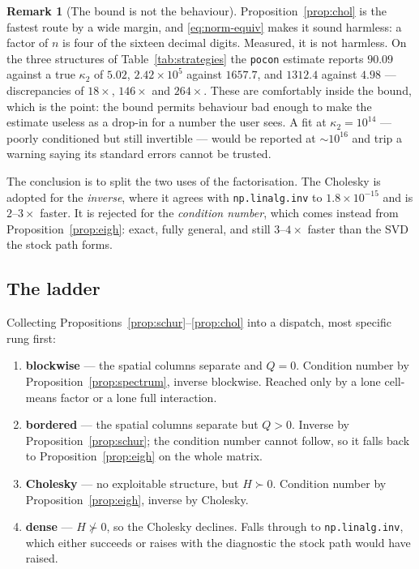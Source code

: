 \documentclass[11pt,a4paper]{article}
\theoremstyle{plain}
\theoremstyle{definition}
\newtheorem{remark}[proposition]{Remark}
\newcommand{\cond}{\kappa}
\begin{document}
\begin{remark}[The bound is not the behaviour]\label{rem:pocon}
Proposition~\ref{prop:chol} is the fastest route by a wide margin, and \eqref{eq:norm-equiv}
makes it sound harmless: a factor of $n$ is four of the sixteen decimal digits. Measured, it is
not harmless. On the three structures of Table~\ref{tab:strategies} the \texttt{pocon} estimate
reports $90.09$ against a true $\cond_2$ of $5.02$, $2.42\times10^{5}$ against $1657.7$, and
$1312.4$ against $4.98$ --- discrepancies of $18\times$, $146\times$ and $264\times$. These are
comfortably inside the bound, which is the point: the bound permits behaviour bad enough to
make the estimate useless as a drop-in for a number the user sees. A fit at
$\cond_2 = 10^{14}$ --- poorly conditioned but still invertible --- would be reported at
$\sim\!10^{16}$ and trip a warning saying its standard errors cannot be trusted.

The conclusion is to split the two uses of the factorisation. The Cholesky is adopted for the
\emph{inverse}, where it agrees with \texttt{np.linalg.inv} to $1.8\times10^{-15}$ and is
$2$--$3\times$ faster. It is rejected for the \emph{condition number}, which comes instead from
Proposition~\ref{prop:eigh}: exact, fully general, and still $3$--$4\times$ faster than the SVD
the stock path forms.
\end{remark}

\subsection{The ladder}\label{sec:ladder}

Collecting Propositions~\ref{prop:schur}--\ref{prop:chol} into a dispatch, most specific rung
first:

\begin{enumerate}
  \item \textbf{blockwise} --- the spatial columns separate and $Q = 0$. Condition number by
        Proposition~\ref{prop:spectrum}, inverse blockwise. Reached only by a lone cell-means
        factor or a lone full interaction.
  \item \textbf{bordered} --- the spatial columns separate but $Q > 0$. Inverse by
        Proposition~\ref{prop:schur}; the condition number cannot follow, so it falls back to
        Proposition~\ref{prop:eigh} on the whole matrix.
  \item \textbf{Cholesky} --- no exploitable structure, but $H \succ 0$. Condition number by
        Proposition~\ref{prop:eigh}, inverse by Cholesky.
  \item \textbf{dense} --- $H \not\succ 0$, so the Cholesky declines. Falls through to
        \texttt{np.linalg.inv}, which either succeeds or raises with the diagnostic the stock
        path would have raised.
\end{enumerate}
\end{document}
